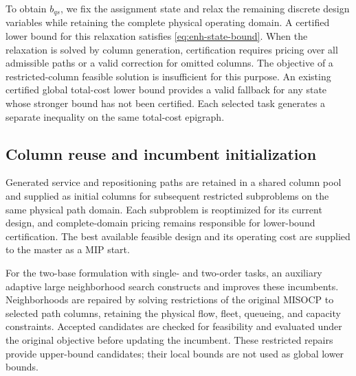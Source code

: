To obtain $b_{qs}$, we fix the assignment state and relax the remaining discrete design variables while retaining the complete physical operating domain.
A certified lower bound for this relaxation satisfies \eqref{eq:enh-state-bound}.
When the relaxation is solved by column generation, certification requires pricing over all admissible paths or a valid correction for omitted columns.
The objective of a restricted-column feasible solution is insufficient for this purpose.
An existing certified global total-cost lower bound provides a valid fallback for any state whose stronger bound has not been certified.
Each selected task generates a separate inequality on the same total-cost epigraph.

\subsection{Column reuse and incumbent initialization}
\label{app:enh-warm}

Generated service and repositioning paths are retained in a shared column pool and supplied as initial columns for subsequent restricted subproblems on the same physical path domain.
Each subproblem is reoptimized for its current design, and complete-domain pricing remains responsible for lower-bound certification.
The best available feasible design and its operating cost are supplied to the master as a MIP start.

For the two-base formulation with single- and two-order tasks, an auxiliary adaptive large neighborhood search constructs and improves these incumbents.
Neighborhoods are repaired by solving restrictions of the original MISOCP to selected path columns, retaining the physical flow, fleet, queueing, and capacity constraints.
Accepted candidates are checked for feasibility and evaluated under the original objective before updating the incumbent.
These restricted repairs provide upper-bound candidates; their local bounds are not used as global lower bounds.
